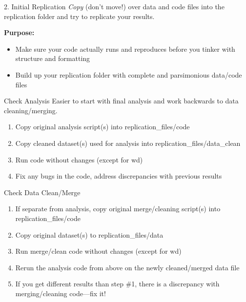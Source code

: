\documentclass[12pt, compress]{beamer} %
\renewcommand{\texttt}[2][ceruleanblue]{\textcolor{#1}{\ttfamily #2}}%
\let\noteitem\item %
\renewcommand{\item}{ 
	\noteitem\vspace{\fill}
	}
\begin{document}
		 \begin{frame}{2. Initial Replication}
		 	\textit{Copy} (don't move!) over data and code files into the replication folder and try to replicate your results.
		 	
		 	\bigskip
		 	
		 	\textbf{Purpose:}
			 	\begin{itemize}
			 		\item Make sure your code actually runs and \textcolor{burntorange}{reproduces} before you tinker with structure and formatting
			 		\item Build up your replication folder with \textcolor{burntorange}{complete and parsimonious} data/code files
			 	\end{itemize}
		 \end{frame}
		 
		\begin{frame}{Check Analysis}
			Easier to start with final analysis and work backwards to data cleaning/merging. 
			
			
			\begin{enumerate}
				\item Copy original analysis script(s) into \texttt{replication\_files/code}
				\item Copy cleaned dataset(s) used for analysis into \texttt{replication\_files/data\_clean}
				\item Run code without changes (except for wd)
				\item Fix any bugs in the code, address discrepancies with previous results
			\end{enumerate}
		\end{frame}
		
		\begin{frame}{Check Data Clean/Merge}
			\begin{enumerate}
				\item If separate from analysis, copy original merge/cleaning script(s) into \texttt{replication\_files/code}
				\item Copy original dataset(s) to \texttt{replication\_files/data}
				\item Run merge/clean code without changes (except for wd)
				\item Rerun the analysis code from above on the newly cleaned/merged data file
				\item If you get different results than step \#1, there is a discrepancy with  merging/cleaning code---fix it!
			\end{enumerate}
		\end{frame}
		
\end{document}
